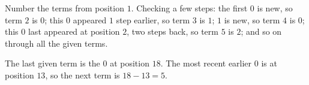 Number the terms from position $1$. Checking a few steps: the first $0$ is new, so term $2$ is $0$; this $0$ appeared $1$ step earlier, so term $3$ is $1$; $1$ is new, so term $4$ is $0$; this $0$ last appeared at position $2$, two steps back, so term $5$ is $2$; and so on through all the given terms.

The last given term is the $0$ at position $18$. The most recent earlier $0$ is at position $13$, so the next term is $18-13=\boxed{5}$.
